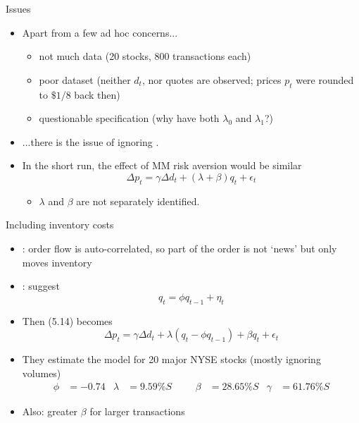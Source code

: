 \documentclass[english,10pt
,aspectratio=169
]{beamer}
\begin{document}
\begin{frame}{Issues}
	\begin{itemize}
		\item Apart from a few ad hoc concerns...
		\begin{itemize}
			\item not much data (20 stocks, 800 transactions each)
			\item poor dataset (neither $d_t$, nor quotes are observed; prices $p_t$ were rounded to $\$1/8$ back then)
			\item questionable specification (why have both $\lambda_0$ and $\lambda_1$?)
		\end{itemize}
		\item ...there is the issue of ignoring .
		\item In the short run, the effect of MM risk aversion would be similar
		\begin{equation} \tag{5.14}
		\Delta p_t = \gamma \Delta d_t + (\lambda + \beta) q_t + \epsilon_t
		\end{equation}
		\begin{itemize}
			\item $\lambda$ and $\beta$ are not separately identified.
		\end{itemize}
	\end{itemize}
\end{frame}


\begin{frame}[label=extending]{Including inventory costs}
	\begin{itemize}
		\item \textbf{\cite{hasbrouck_trades_1988}}: order flow is auto-correlated, so part of the order is not `news' but only moves inventory
		\item \textbf{\cite{huang_components_1997}}: suggest
		\begin{equation}\tag{5.17}
		q_t = \phi q_{t-1} + \eta_t
		\end{equation}
		\item Then (5.14) becomes \hyperlink{derivation}{}
		\begin{equation} \tag{5.21}
		\Delta p_t = \gamma \Delta d_t + \lambda (q_t - \phi q_{t-1}) + \beta q_t + \epsilon_t
		\end{equation}
		\item They estimate the model for 20 major NYSE stocks (mostly ignoring volumes)
		\begin{align*}
			\phi &= -0.74	& \lambda &= 9.59\% S
			&&&
			\beta &= 28.65\% S	& \gamma &= 61.76\% S
		\end{align*}
		\item Also: greater $\beta$ for larger transactions
	\end{itemize}
\end{frame}
\end{document}
